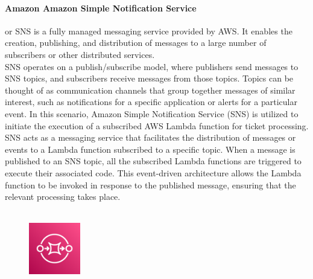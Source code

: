 \documentclass[a4paper,12pt]{report}
\begin{document}
\paragraph{Amazon Amazon Simple Notification Service} or SNS is a fully managed messaging service provided by AWS. It enables the creation, publishing, and distribution of messages to a large number of subscribers or other distributed services.\\
SNS operates on a publish/subscribe model, where publishers send messages to SNS topics, and subscribers receive messages from those topics. Topics can be thought of as communication channels that group together messages of similar interest, such as notifications for a specific application or alerts for a particular event.
In this scenario, Amazon Simple Notification Service (SNS) is utilized to initiate the execution of a subscribed AWS Lambda function for ticket processing. SNS acts as a messaging service that facilitates the distribution of messages or events to a Lambda function subscribed to a specific topic.
When a message is published to an SNS topic, all the subscribed Lambda functions are triggered to execute their associated code. This event-driven architecture allows the Lambda function to be invoked in response to the published message, ensuring that the relevant processing takes place.\\\\
%
%
%
\begin{figure}
  \centering
  \includegraphics[width=0.2\textwidth]{img/services/SQS}
\end{figure}
%
\end{document}
